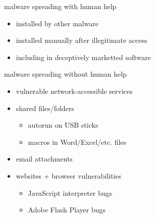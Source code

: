 
\begin{frame}{malware spreading with human help}
    \begin{itemize}
    \item installed by other malware
    \item installed manually after illegitimate access
    \item including in deceptively marketted software
    \end{itemize}
\end{frame}




\begin{frame}{malware spreading without human help}
    \begin{itemize}
        \item vulnerable network-accessible services
        \item shared files/folders  
            \begin{itemize}
            \item autorun on USB sticks
            \item macros in Word/Excel/etc. files
            \end{itemize}
        \item email attachments
        \item websites + browser vulnerabilities
            \begin{itemize}
            \item JavaScript interpreter bugs
            \item Adobe Flash Player bugs
            \end{itemize}
    \end{itemize}
\end{frame}


